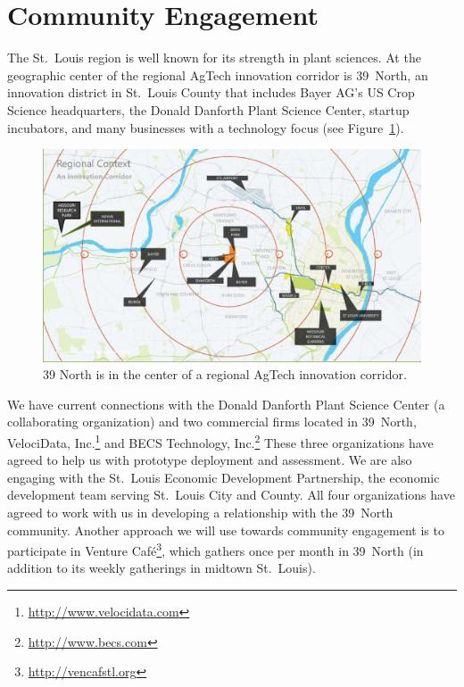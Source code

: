\section{Community Engagement}
\label{sec:community}

The St.~Louis region is well known for its strength in plant sciences.
At the geographic center of the regional AgTech innovation corridor is
39~North, an innovation district in St.~Louis County that includes Bayer AG's
US Crop Science headquarters, the Donald Danforth Plant Science Center,
startup incubators, and many businesses with a technology focus
(see Figure~\ref{fig:39N}).

\begin{figure}[ht]
\centering
\includegraphics[width=0.75\linewidth]{figures/39N}
\caption{39 North is in the center of a regional AgTech innovation corridor.}
\label{fig:39N}
\end{figure}

We have current connections with the Donald Danforth Plant Science
Center (a collaborating organization) and two commercial firms
located in 39~North,
VelociData, Inc.\footnote{\url{http://www.velocidata.com}} and
BECS Technology, Inc.\footnote{\url{http://www.becs.com}}
These three organizations have agreed to help us with prototype deployment
and assessment.
We are also engaging with the St.~Louis Economic Development Partnership,
the economic development team serving St.~Louis City and County.
All four organizations have agreed to work with us in
developing a relationship with the 39~North community.
Another approach we will use towards community engagement is to participate
in Venture Caf\'e\footnote{\url{http://vencafstl.org}}, which gathers once per
month in 39~North (in addition to its weekly gatherings in midtown St.~Louis).
